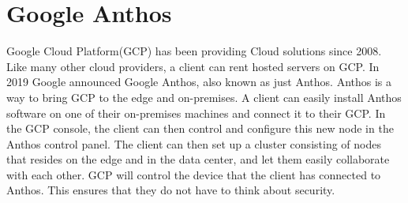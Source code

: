 


\section{Google Anthos}
Google Cloud Platform(GCP) has been providing Cloud solutions since 2008. Like many other cloud providers, a client can rent hosted servers on GCP. In 2019 Google announced Google Anthos, also known as just Anthos. Anthos is a way to bring GCP to the edge and on-premises\cite{noauthor_anthos_nodate}. A client can easily install Anthos software on one of their on-premises machines and connect it to their GCP. In the GCP console, the client can then control and configure this new node in the Anthos control panel. The client can then set up a cluster consisting of nodes that resides on the edge and in the data center, and let them easily collaborate with each other. GCP will control the device that the client has connected to Anthos. This ensures that they do not have to think about security.

